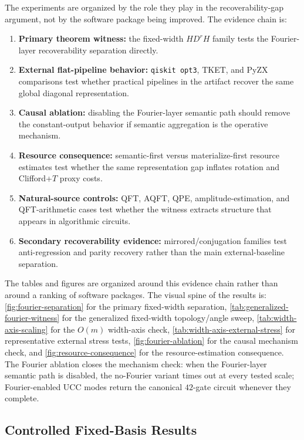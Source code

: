 \documentclass[11pt]{article}
\begin{document}
The experiments are organized by the role they play in the recoverability-gap
argument, not by the software package being improved. The evidence chain is:
\begin{enumerate}[leftmargin=1.5em]
    \item \textbf{Primary theorem witness:} the fixed-width $H D^r H$ family tests the Fourier-layer recoverability separation directly.
    \item \textbf{External flat-pipeline behavior:} \texttt{qiskit opt3}, TKET, and PyZX comparisons test whether practical pipelines in the artifact recover the same global diagonal representation.
    \item \textbf{Causal ablation:} disabling the Fourier-layer semantic path should remove the constant-output behavior if semantic aggregation is the operative mechanism.
    \item \textbf{Resource consequence:} semantic-first versus materialize-first resource estimates test whether the same representation gap inflates rotation and Clifford+$T$ proxy costs.
    \item \textbf{Natural-source controls:} QFT, AQFT, QPE, amplitude-estimation, and QFT-arithmetic cases test whether the witness extracts structure that appears in algorithmic circuits.
    \item \textbf{Secondary recoverability evidence:} mirrored/conjugation families test anti-regression and parity recovery rather than the main external-baseline separation.
\end{enumerate}
The tables and figures are organized around this evidence chain rather than
around a ranking of software packages. The visual spine of the results is:
\cref{fig:fourier-separation} for the primary fixed-width separation,
\cref{tab:generalized-fourier-witness} for the generalized fixed-width
topology/angle sweep, \cref{tab:width-axis-scaling} for the $O(m)$ width-axis
check, \cref{tab:width-axis-external-stress} for representative external
stress tests, \cref{fig:fourier-ablation} for the causal mechanism check, and
\cref{fig:resource-consequence} for the resource-estimation consequence.
The Fourier ablation closes the mechanism check: when the Fourier-layer
semantic path is disabled, the no-Fourier variant times out at every tested
scale; Fourier-enabled UCC modes return the canonical $42$-gate circuit
whenever they complete.

\subsection{Controlled Fixed-Basis Results}
\end{document}
